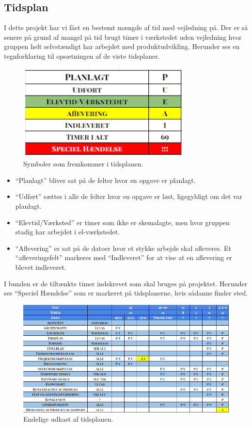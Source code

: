 \subsection{Tidsplan}

I dette projekt har vi fået en bestemt mængde af tid med vejledning på. Der er så senere på grund af mangel på tid brugt timer i værkstedet uden vejledning hvor gruppen helt selvstændigt har arbejdet med produktudvikling. Herunder ses en tegnforklaring til opsætningen af de viste tidsplaner.



\begin{figure}[H]
\centering
\includegraphics[scale=0.5]{Billeder/Tidsplan_symboler}
\caption{Symboler som fremkommer i tidsplanen.}
\label{fig:tidsplan_symboler}
\end{figure}


\begin{itemize}

\item “Planlagt” bliver sat på de felter hvor en opgave er planlagt.

\item “Udført” sættes i alle de felter hvor en opgave er løst, ligegyldigt om det var planlagt.

\item “Elevtid/Værksted” er timer som ikke er skemalagte, men hvor gruppen stadig har arbejdet i el-værkstedet.

\item “Aflevering” er sat på de datoer hvor et stykke arbejde skal afleveres. Et “afleveringsfelt” markeres med “Indleveret” for at vise at en aflevering er blevet indleveret. 

\end{itemize}


I bunden er de tiltænkte timer indskrevet som skal bruges på projektet. Herunder ses “Speciel Hændelse” som er markeret på tidsplanerne, hvis sådanne finder sted.




\begin{figure}[H]
\centering
\includegraphics[scale=0.8, angle = 90]{Billeder/Tidsplan_1}
\caption{Endelige udkast af tidsplanen.}
\label{fig:tidsplan_1}
\end{figure}
